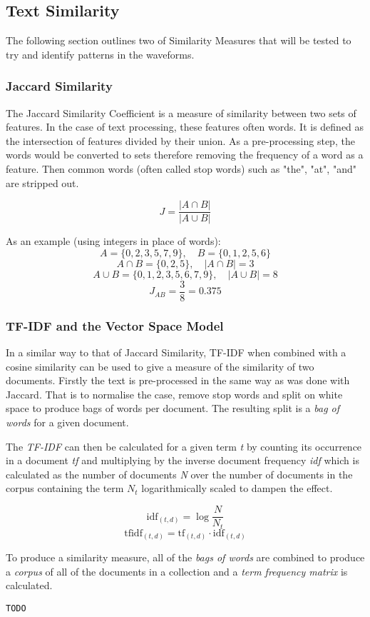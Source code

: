 \documentclass[../report.tex]{subfiles}
\begin{document}
\subsection{Text Similarity}

	The following section outlines two of Similarity Measures that will be tested to try and identify patterns in the waveforms.

\subsubsection{Jaccard Similarity} \label{sec:bkg-jaccard}

	The Jaccard Similarity Coefficient is a measure of similarity between two sets of features.  In the case of text processing, these features often words.  It is defined as the intersection of features divided by their union.  As a pre-processing step, the words would be converted to sets therefore removing the frequency of a word as a feature.  Then common words (often called stop words) such as "the", "at", "and" are stripped out.
	
	$$
	J = \frac{|A \cap B|}{|A \cup B|}
	$$
	
	As an example (using integers in place of words):
	$$ A = \{0, 2, 3, 5, 7, 9\},\quad B = \{0, 1, 2, 5, 6\} $$
	$$ A\cap B = \{0, 2, 5\},\quad |A\cap B| = 3 $$
	$$ A\cup B = \{0, 1, 2, 3, 5, 6, 7, 9\},\quad |A\cup B| = 8	$$
	$$ J_{AB} = \frac{3}{8} = 0.375 $$

\subsubsection{TF-IDF and the Vector Space Model}
	
	In a similar way to that of Jaccard Similarity, TF-IDF when combined with a cosine similarity can be used to give a measure of the similarity of two documents.  Firstly the text is pre-processed in the same way as was done with Jaccard.  That is to normalise the case, remove stop words and split on white space to produce bags of words per document.  The resulting split is a \textit{bag of words} for a given document.
	
	The \textit{TF-IDF} can then be calculated for a given term \textit{t} by counting its occurrence in a document \textit{tf} and multiplying by the inverse document frequency \textit{idf} which is calculated as the number of documents \textit{N} over the number of documents in the corpus containing the term \textit{$N_{t}$} logarithmically scaled to dampen the effect.
	
	$$ \text{idf}_{(t,d)} = \log{\frac{N}{N_{t}}}$$
	$$ \text{tfidf}_{(t, d)} = \text{tf}_{(t,d)} \cdot \text{idf}_{(t,d)} $$
	
	To produce a similarity measure, all of the \textit{bags of words} are combined to produce a \textit{corpus} of all of the documents in a collection and a \textit{term frequency matrix} is calculated.
	
	\verb|TODO|
\end{document}
